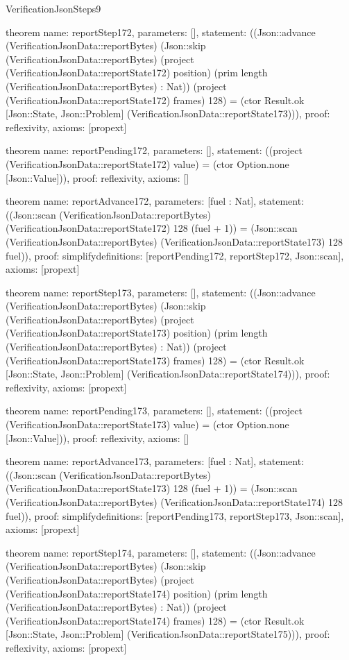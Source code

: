 \begin{lexlean}{VerificationJsonSteps9}
\begin{semanticmodule}
theorem{
  name: reportStep172,
  parameters: [],
  statement: ((Json::advance (VerificationJsonData::reportBytes) (Json::skip (VerificationJsonData::reportBytes) (project (VerificationJsonData::reportState172) position) (prim length (VerificationJsonData::reportBytes) : Nat)) (project (VerificationJsonData::reportState172) frames) 128) = (ctor Result.ok [Json::State, Json::Problem] (VerificationJsonData::reportState173))),
  proof: reflexivity{},
  axioms: [propext]
}

theorem{
  name: reportPending172,
  parameters: [],
  statement: ((project (VerificationJsonData::reportState172) value) = (ctor Option.none [Json::Value])),
  proof: reflexivity{},
  axioms: []
}

theorem{
  name: reportAdvance172,
  parameters: [fuel : Nat],
  statement: ((Json::scan (VerificationJsonData::reportBytes) (VerificationJsonData::reportState172) 128 (fuel + 1)) = (Json::scan (VerificationJsonData::reportBytes) (VerificationJsonData::reportState173) 128 fuel)),
  proof: simplify{definitions: [reportPending172, reportStep172, Json::scan]},
  axioms: [propext]
}

theorem{
  name: reportStep173,
  parameters: [],
  statement: ((Json::advance (VerificationJsonData::reportBytes) (Json::skip (VerificationJsonData::reportBytes) (project (VerificationJsonData::reportState173) position) (prim length (VerificationJsonData::reportBytes) : Nat)) (project (VerificationJsonData::reportState173) frames) 128) = (ctor Result.ok [Json::State, Json::Problem] (VerificationJsonData::reportState174))),
  proof: reflexivity{},
  axioms: [propext]
}

theorem{
  name: reportPending173,
  parameters: [],
  statement: ((project (VerificationJsonData::reportState173) value) = (ctor Option.none [Json::Value])),
  proof: reflexivity{},
  axioms: []
}

theorem{
  name: reportAdvance173,
  parameters: [fuel : Nat],
  statement: ((Json::scan (VerificationJsonData::reportBytes) (VerificationJsonData::reportState173) 128 (fuel + 1)) = (Json::scan (VerificationJsonData::reportBytes) (VerificationJsonData::reportState174) 128 fuel)),
  proof: simplify{definitions: [reportPending173, reportStep173, Json::scan]},
  axioms: [propext]
}

theorem{
  name: reportStep174,
  parameters: [],
  statement: ((Json::advance (VerificationJsonData::reportBytes) (Json::skip (VerificationJsonData::reportBytes) (project (VerificationJsonData::reportState174) position) (prim length (VerificationJsonData::reportBytes) : Nat)) (project (VerificationJsonData::reportState174) frames) 128) = (ctor Result.ok [Json::State, Json::Problem] (VerificationJsonData::reportState175))),
  proof: reflexivity{},
  axioms: [propext]
}


\end{semanticmodule}
\end{lexlean}
